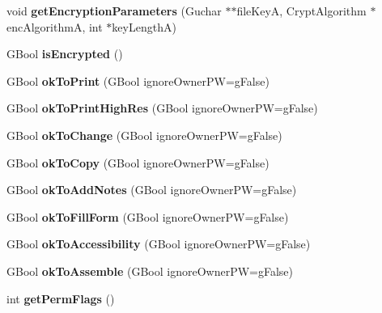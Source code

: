 \begin{DoxyCompactItemize}
void {\bfseries get\+Encryption\+Parameters} (Guchar $\ast$$\ast$file\+KeyA, Crypt\+Algorithm $\ast$enc\+AlgorithmA, int $\ast$key\+LengthA)
\item 
\mbox{\label{class_x_ref_a5a4c4c8df2e0cbc9e4a913a6ca79e867}} 
G\+Bool {\bfseries is\+Encrypted} ()
\item 
\mbox{\label{class_x_ref_add77c7c0f6b13faea4af1fdc916b93be}} 
G\+Bool {\bfseries ok\+To\+Print} (G\+Bool ignore\+Owner\+PW=g\+False)
\item 
\mbox{\label{class_x_ref_a62822e35925af56c87a5f9cc0f1aadf0}} 
G\+Bool {\bfseries ok\+To\+Print\+High\+Res} (G\+Bool ignore\+Owner\+PW=g\+False)
\item 
\mbox{\label{class_x_ref_ae59073f68a44cbcbf06516ec281c63ff}} 
G\+Bool {\bfseries ok\+To\+Change} (G\+Bool ignore\+Owner\+PW=g\+False)
\item 
\mbox{\label{class_x_ref_a8af09d7ab067710bdc07115b060ba3ba}} 
G\+Bool {\bfseries ok\+To\+Copy} (G\+Bool ignore\+Owner\+PW=g\+False)
\item 
\mbox{\label{class_x_ref_a047d0ed1d1fdc60121f878af04649d39}} 
G\+Bool {\bfseries ok\+To\+Add\+Notes} (G\+Bool ignore\+Owner\+PW=g\+False)
\item 
\mbox{\label{class_x_ref_a1814b04953df88d47171a365e62a2d3c}} 
G\+Bool {\bfseries ok\+To\+Fill\+Form} (G\+Bool ignore\+Owner\+PW=g\+False)
\item 
\mbox{\label{class_x_ref_a7d19b85c13fb51a973b8107576c05751}} 
G\+Bool {\bfseries ok\+To\+Accessibility} (G\+Bool ignore\+Owner\+PW=g\+False)
\item 
\mbox{\label{class_x_ref_a1b8b168111e3bfca4f2593dd41f046d1}} 
G\+Bool {\bfseries ok\+To\+Assemble} (G\+Bool ignore\+Owner\+PW=g\+False)
\item 
\mbox{\label{class_x_ref_a5fd32cdd411131940bc578507c362883}} 
int {\bfseries get\+Perm\+Flags} ()
\item 
\mbox{\label{class_x_ref_aa2c923e251a0e21d668b2837763eeebd}} 
$$
\end{DoxyCompactItemize}
